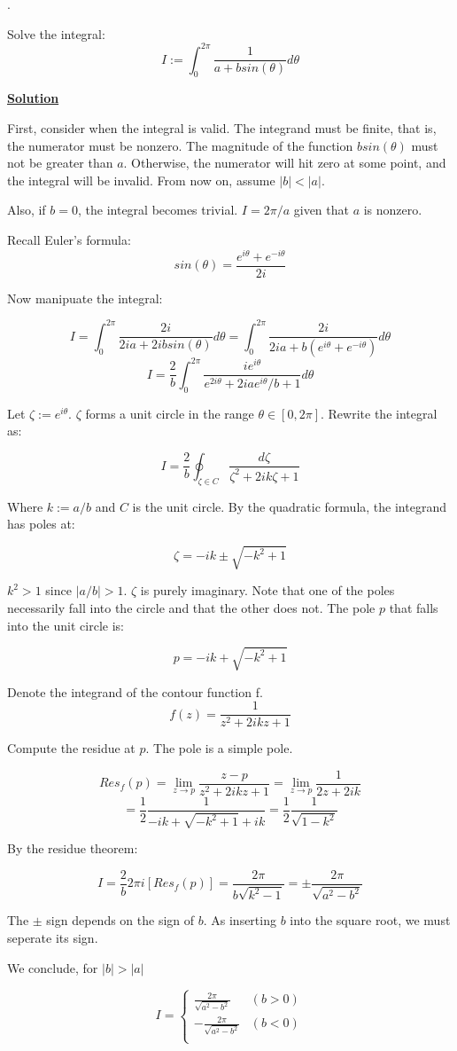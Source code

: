 \documentclass{article}
\newcommand{\new}[1]{
    \vspace{2mm}
    \noindent
    \textbf{
    \underline{#1}}
}
\newcounter{problemcnt}
\newcommand{\Problem}{{
    \vspace{5mm}
    \stepcounter{problemcnt}
    \noindent
    \arabic{problemcnt}. 
}
}
\begin{document}
\newpage
\Problem
Solve the integral:
\[
    I:=
    \int_{0}^{2\pi}
    \frac{1}{a+bsin(\theta)} d\theta
\]

\new{Solution}
First, consider when the integral is valid. The integrand 
must be finite, that is, the numerator must be nonzero. 
The magnitude of the function $bsin(\theta)$ must not be greater 
than $a$. Otherwise, the numerator will hit zero at some point, 
and the integral will be invalid. From now on, assume $|b|<|a|$. 

Also, if $b = 0$, the integral becomes trivial. $I = 2\pi/a$ 
given that $a$ is nonzero. 

Recall Euler's formula:
\[
    sin(\theta) = \frac{e^{i\theta}+e^{-i\theta}}{2i}
\]

Now manipuate the integral:

\[
    I = 
 \int_{0}^{2\pi}
 \frac{2i}{2ia+2ibsin(\theta)} d\theta
=
 \int_{0}^{2\pi}
 \frac{2i}{2ia+b(e^{i\theta}+e^{-i\theta})} d\theta
\]
\[
    I = \frac{2}{b}
 \int_{0}^{2\pi}
 \frac{ie^{i\theta}}
 {e^{2i\theta}+2iae^{i\theta}/b+1}d\theta
\]

Let $\zeta := e^{i\theta}$. $\zeta$ forms 
a unit circle in the range $\theta\in[0, 2\pi]$. 
Rewrite the integral as:

\[
    I = \frac{2}{b}
    \oint_{\zeta \in C}
    \frac{d\zeta}
    {\zeta^2+2ik\zeta+1}
\]

Where $k:=a/b$ and $C$ is the unit circle. 
By the quadratic formula, the integrand has poles at:

\[
    \zeta = -ik\pm \sqrt{-k^2+1}
\]

$k^2 > 1$ since $|a/b| >1$. $\zeta$ is purely imaginary. 
Note that one of the poles necessarily fall into the circle 
and that the other does not. The pole $p$ that falls into 
the unit circle is:

\[
    p= -ik+\sqrt{-k^2+1}
\]

Denote the integrand of the contour function f. 
\[
    f(z) = 
    \frac{1}{z^2+2ikz+1}
\]

Compute the residue at $p$. The pole is a simple pole. 

\[
    Res_f(p) = 
    \lim_{z\rightarrow p}
    \frac{z-p}
    {z^2+2ikz+1}
    =
      \lim_{z\rightarrow p}
    \frac{1}{2z+2ik}
\]
\[
    =
    \frac{1}{2}
    \frac{1}{-ik+\sqrt{-k^2+1}+ik}
    =
    \frac{1}{2}
    \frac{1}{\sqrt{1-k^2}}
\]

By the residue theorem:

\[
    I = \frac{2}{b}2\pi i [Res_f(p)] = 
    \frac{2\pi}{b\sqrt{k^2-1}}
    =\pm\frac{2\pi}{\sqrt{a^2-b^2}}
\]

The $\pm$ sign depends on the sign of $b$. As 
inserting $b$ into the square root, we must seperate 
its sign. 

We conclude, for $|b|> |a|$

\[
    \boxed{
        I = 
        \begin{cases}
            \frac{2\pi}{\sqrt{a^2-b^2}} & (b>0)\\
            -\frac{2\pi}{\sqrt{a^2-b^2}} & (b<0)\\
        \end{cases}
    }
\]  
\end{document}

